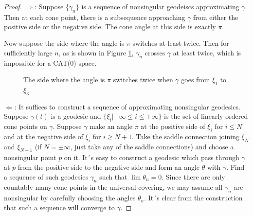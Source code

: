 \documentclass[reqno]{amsart}
\theoremstyle{plain}
\theoremstyle{definition}
\theoremstyle{remark}
\theoremstyle{definition}
\newcommand{\?}{\textcolor{red}{?}}
\begin{document}
\begin{proof}
$\Rightarrow$: Suppose $\{\gamma_n\}$ is a sequence of nonsingular geodeiscs approximating $\gamma$. Then at each cone point, there is a subsequence approaching $\gamma$ from either the positive side or the negative side. The cone angle at this side is exactly $\pi$. 

Now suppose the side where the angle is $\pi$ switches at least twice. Then for sufficiently large $n$, as is shown in Figure \ref{twice}, $\gamma_n$ crosses $\gamma$ at least twice, which is impossible for a CAT(0) space.
\begin{figure}[h]
    \centering
    \caption{The side where the angle is $\pi$ switches twice when $\gamma$ goes from $\xi_1$ to $\xi_3$.}
    \label{twice}
\end{figure}

$\Leftarrow$: It suffices to construct a sequence of approximating nonsingular geodesics. Suppose $\gamma(t)$ is a geodesic and $\{ \xi_i | -\infty\le i \le +\infty \}$ is the set of linearly ordered cone points on $\gamma$. Suppose $\gamma$ make an angle $\pi$ at the positive side of $\xi_i$ for $i\le N$ and at the negative side of $\xi_i$ for $i\ge N+1$. Take the saddle connection joining $\xi_N$ and $\xi_{N+1}$ (if $N=\pm\infty$, just take any of the saddle connections) and choose a nonsingular point $p$ on it. It´s easy to construct a geodesic which pass through $\gamma$ at $p$ from the positive side to the negative side and form an angle $\theta$ with $\gamma$. Find a sequence of such geodesics $\gamma_n$ such that $\lim \theta_n=0$. Since there are only countably many cone points in the universal covering, we may assume all $\gamma_n$ are nonsingular by carefully choosing the angles $\theta_n$. It´s clear from the construction that such a sequence will converge to $\gamma$.
\end{proof}
\end{document}
